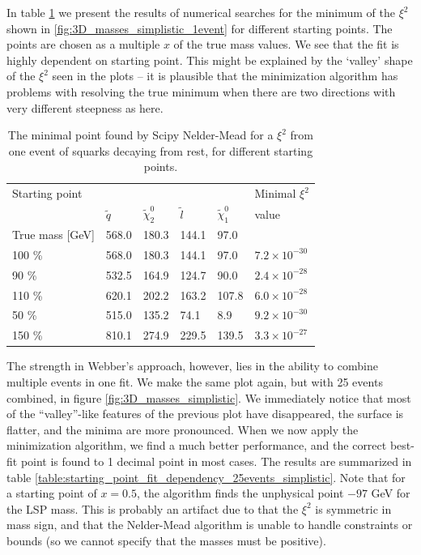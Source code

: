 \documentclass[twoside,english]{uiofysmaster}
\begin{document}
In table \ref{table:starting_point_fit_dependency_1event_simplistic} we present the results of numerical searches for the minimum of the $\xi^2$ shown in \ref{fig:3D_masses_simplistic_1event} for different starting points. The points are chosen as a multiple $x$ of the true mass values.  We see that the fit is highly dependent on starting point. This might be explained by the `valley' shape of the $\xi^2$ seen in the plots -- it is plausible that the minimization algorithm has problems with resolving the true minimum when there are two directions with very different steepness as here.

\begin{table}[hbt]
	\centering
	\begin{tabular}{| l | l | l | l | l | l |}
		\hline
		Starting point  &&&&																					&  Minimal $\xi^2$ \\ 
		 						& $\tilde q$	& $\tilde \chi_2^0$	& $\tilde l$	& $\tilde \chi_1^0$ & value \\ \hline
		True mass [GeV]			& 568.0         & 180.3 			& 144.1			&  97.0				& \\ \hline
		100 \% 					& 568.0  		& 180.3   			& 144.1  		&  97.0				& $7.2\times 10^{-30}$ \\ \hline
		90 \% 					& 532.5  		& 164.9   			& 124.7  		&  90.0				& $2.4\times 10^{-28}$ \\ \hline
		110 \%					& 620.1  		& 202.2   			& 163.2  		& 107.8				& $6.0\times 10^{-28}$ \\ \hline
		50 \% 					& 515.0  		& 135.2   			&  74.1  		&   8.9				& $9.2\times 10^{-30}$ \\ \hline
		150 \% 					& 810.1  		& 274.9   			& 229.5  		& 139.5				& $3.3\times 10^{-27}$ \\ \hline
	\end{tabular}
	\caption{The minimal point found by Scipy Nelder-Mead for a $\xi^2$ from one event of squarks decaying from rest, for different starting points.}
	\label{table:starting_point_fit_dependency_1event_simplistic}
\end{table}

The strength in Webber's approach, however, lies in the ability to combine multiple events in one fit. We make the same plot again, but with 25 events combined, in figure \ref{fig:3D_masses_simplistic}. We immediately notice that most of the ``valley''-like features of the previous plot have disappeared, the surface is flatter, and the minima are more pronounced. When we now apply the minimization algorithm, we find a much better performance, and the correct best-fit point is found to 1 decimal point in most cases. The results are summarized in table \ref{table:starting_point_fit_dependency_25events_simplistic}. Note that for a starting point of $x = 0.5$, the algorithm finds the unphysical point $-97$ GeV for the LSP mass. This is probably an artifact due to that the $\xi^2$ is symmetric in mass sign, and that the Nelder-Mead algorithm is unable to handle constraints or bounds (so we cannot specify that the masses must be positive).
\end{document}
